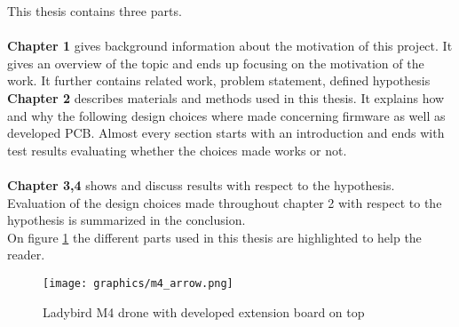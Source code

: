 This thesis contains three parts.\\ \\
\textbf{Chapter 1} gives background information about the motivation of this project.
It gives an overview of the topic and ends up focusing on the motivation of the work. It further contains related work,  problem statement, defined hypothesis \\
\textbf{Chapter 2} describes materials and methods used in this thesis. It explains how and why the following design choices where made concerning firmware as well as developed \ac{PCB}. Almost every section starts with an introduction and ends with test results evaluating whether the choices made works or not.\\ \\
\textbf{Chapter 3,4} shows and discuss results with respect to the hypothesis. Evaluation of the design choices made throughout chapter 2 with respect to the hypothesis is summarized in the conclusion. \\


On figure \ref{fig:drone_with_arrows} the different parts used in this thesis are highlighted to help the reader.

\begin{figure}[H]
    \center
    \texttt{[image: graphics/m4\_arrow.png]}
  \caption{Ladybird M4 drone with developed extension board on top}
  \label{fig:drone_with_arrows}
\end{figure}

